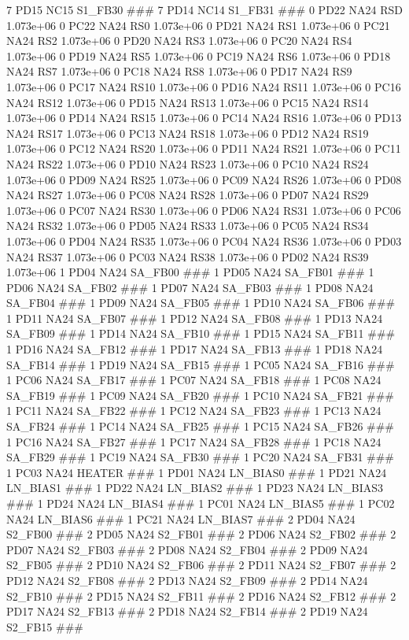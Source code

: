 7 PD15 NC15 S1_FB30 ### 
7 PD14 NC14 S1_FB31 ### 
0 PD22 NA24 RSD 1.073e+06 
0 PC22 NA24 RS0 1.073e+06 
0 PD21 NA24 RS1 1.073e+06 
0 PC21 NA24 RS2 1.073e+06 
0 PD20 NA24 RS3 1.073e+06 
0 PC20 NA24 RS4 1.073e+06 
0 PD19 NA24 RS5 1.073e+06 
0 PC19 NA24 RS6 1.073e+06 
0 PD18 NA24 RS7 1.073e+06 
0 PC18 NA24 RS8 1.073e+06 
0 PD17 NA24 RS9 1.073e+06 
0 PC17 NA24 RS10 1.073e+06 
0 PD16 NA24 RS11 1.073e+06 
0 PC16 NA24 RS12 1.073e+06 
0 PD15 NA24 RS13 1.073e+06 
0 PC15 NA24 RS14 1.073e+06 
0 PD14 NA24 RS15 1.073e+06 
0 PC14 NA24 RS16 1.073e+06 
0 PD13 NA24 RS17 1.073e+06 
0 PC13 NA24 RS18 1.073e+06 
0 PD12 NA24 RS19 1.073e+06 
0 PC12 NA24 RS20 1.073e+06 
0 PD11 NA24 RS21 1.073e+06 
0 PC11 NA24 RS22 1.073e+06 
0 PD10 NA24 RS23 1.073e+06 
0 PC10 NA24 RS24 1.073e+06 
0 PD09 NA24 RS25 1.073e+06 
0 PC09 NA24 RS26 1.073e+06 
0 PD08 NA24 RS27 1.073e+06 
0 PC08 NA24 RS28 1.073e+06 
0 PD07 NA24 RS29 1.073e+06 
0 PC07 NA24 RS30 1.073e+06 
0 PD06 NA24 RS31 1.073e+06 
0 PC06 NA24 RS32 1.073e+06 
0 PD05 NA24 RS33 1.073e+06 
0 PC05 NA24 RS34 1.073e+06 
0 PD04 NA24 RS35 1.073e+06 
0 PC04 NA24 RS36 1.073e+06 
0 PD03 NA24 RS37 1.073e+06 
0 PC03 NA24 RS38 1.073e+06 
0 PD02 NA24 RS39 1.073e+06 
1 PD04 NA24 SA_FB00 ### 
1 PD05 NA24 SA_FB01 ### 
1 PD06 NA24 SA_FB02 ### 
1 PD07 NA24 SA_FB03 ### 
1 PD08 NA24 SA_FB04 ### 
1 PD09 NA24 SA_FB05 ### 
1 PD10 NA24 SA_FB06 ### 
1 PD11 NA24 SA_FB07 ### 
1 PD12 NA24 SA_FB08 ### 
1 PD13 NA24 SA_FB09 ### 
1 PD14 NA24 SA_FB10 ### 
1 PD15 NA24 SA_FB11 ### 
1 PD16 NA24 SA_FB12 ### 
1 PD17 NA24 SA_FB13 ### 
1 PD18 NA24 SA_FB14 ### 
1 PD19 NA24 SA_FB15 ### 
1 PC05 NA24 SA_FB16 ### 
1 PC06 NA24 SA_FB17 ### 
1 PC07 NA24 SA_FB18 ### 
1 PC08 NA24 SA_FB19 ### 
1 PC09 NA24 SA_FB20 ### 
1 PC10 NA24 SA_FB21 ### 
1 PC11 NA24 SA_FB22 ### 
1 PC12 NA24 SA_FB23 ### 
1 PC13 NA24 SA_FB24 ### 
1 PC14 NA24 SA_FB25 ### 
1 PC15 NA24 SA_FB26 ### 
1 PC16 NA24 SA_FB27 ### 
1 PC17 NA24 SA_FB28 ### 
1 PC18 NA24 SA_FB29 ### 
1 PC19 NA24 SA_FB30 ### 
1 PC20 NA24 SA_FB31 ### 
1 PC03 NA24 HEATER ### 
1 PD01 NA24 LN_BIAS0 ### 
1 PD21 NA24 LN_BIAS1 ### 
1 PD22 NA24 LN_BIAS2 ### 
1 PD23 NA24 LN_BIAS3 ### 
1 PD24 NA24 LN_BIAS4 ### 
1 PC01 NA24 LN_BIAS5 ### 
1 PC02 NA24 LN_BIAS6 ### 
1 PC21 NA24 LN_BIAS7 ### 
2 PD04 NA24 S2_FB00 ### 
2 PD05 NA24 S2_FB01 ### 
2 PD06 NA24 S2_FB02 ### 
2 PD07 NA24 S2_FB03 ### 
2 PD08 NA24 S2_FB04 ### 
2 PD09 NA24 S2_FB05 ### 
2 PD10 NA24 S2_FB06 ### 
2 PD11 NA24 S2_FB07 ### 
2 PD12 NA24 S2_FB08 ### 
2 PD13 NA24 S2_FB09 ### 
2 PD14 NA24 S2_FB10 ### 
2 PD15 NA24 S2_FB11 ### 
2 PD16 NA24 S2_FB12 ### 
2 PD17 NA24 S2_FB13 ### 
2 PD18 NA24 S2_FB14 ### 
2 PD19 NA24 S2_FB15 ### 
